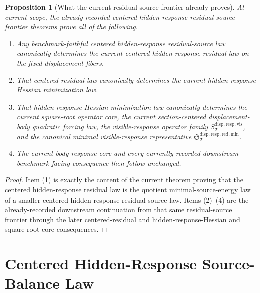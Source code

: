 \documentclass[11pt]{article}
\newcommand{\VisibleResponseOperator}[1]{S_{#1}^{\mathrm{disp,resp,vis}}}
\newcommand{\MinimalReducedStructure}{\mathfrak S^{\mathrm{disp,resp,red,min}}}
\newtheorem{proposition}{Proposition}
\begin{document}
\begin{proposition}[What the current residual-source frontier already proves]
\label{prop:frontier}
At current scope, the already-recorded centered-hidden-response-residual-source frontier theorems prove all of the following.
\begin{enumerate}
    \item Any benchmark-faithful centered hidden-response residual-source law canonically determines the current centered hidden-response residual law on the fixed displacement fibers.
    \item That centered residual law canonically determines the current hidden-response Hessian minimization law.
    \item That hidden-response Hessian minimization law canonically determines the current square-root operator core, the current section-centered displacement-body quadratic forcing law, the visible-response operator family \(\VisibleResponseOperator{\sigma}\), and the canonical minimal visible-response representative \(\MinimalReducedStructure_{\sigma}\).
    \item The current body-response core and every currently recorded downstream benchmark-facing consequence then follow unchanged.
\end{enumerate}
\end{proposition}

\begin{proof}
Item (1) is exactly the content of the current theorem proving that the centered hidden-response residual law is the quotient minimal-source-energy law of a smaller centered hidden-response residual-source law. Items (2)--(4) are the already-recorded downstream continuation from that same residual-source frontier through the later centered-residual and hidden-response-Hessian and square-root-core consequences.
\end{proof}

\section{Centered Hidden-Response Source-Balance Law}
\end{document}
